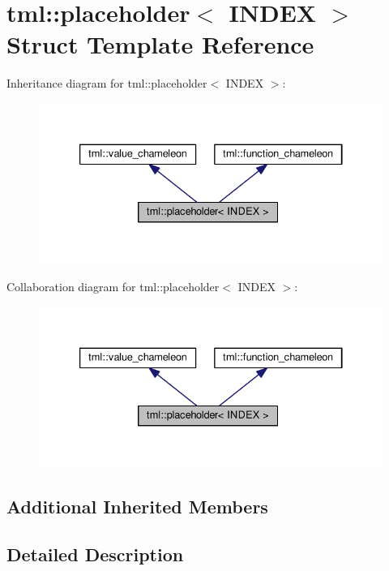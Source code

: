 \hypertarget{structtml_1_1placeholder}{\section{tml\+:\+:placeholder$<$ I\+N\+D\+E\+X $>$ Struct Template Reference}
\label{structtml_1_1placeholder}
}


Inheritance diagram for tml\+:\+:placeholder$<$ I\+N\+D\+E\+X $>$\+:
\nopagebreak
\begin{figure}[H]
\begin{center}
\leavevmode
\includegraphics[width=333pt]{structtml_1_1placeholder__inherit__graph}
\end{center}
\end{figure}


Collaboration diagram for tml\+:\+:placeholder$<$ I\+N\+D\+E\+X $>$\+:
\nopagebreak
\begin{figure}[H]
\begin{center}
\leavevmode
\includegraphics[width=333pt]{structtml_1_1placeholder__coll__graph}
\end{center}
\end{figure}
\subsection*{Additional Inherited Members}


\subsection{Detailed Description}
